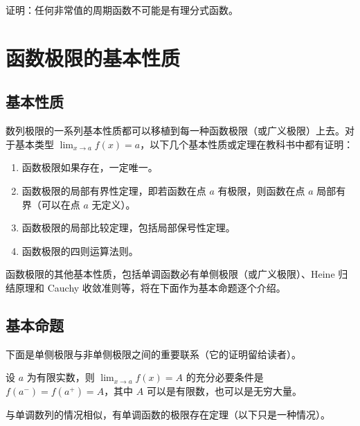 \begin{xexercise}[14]
证明：任何非常值的周期函数不可能是有理分式函数。
\end{xexercise}

\section{函数极限的基本性质}

\subsection{基本性质}

数列极限的一系列基本性质都可以移植到每一种函数极限（或广义极限）上去。对于基本类型 $\lim_{x\to a}f(x)=a$，以下几个基本性质或定理在教科书中都有证明：
\begin{enumerate}
  \item 函数极限如果存在，一定唯一。
  \item 函数极限的局部有界性定理，即若函数在点 $a$ 有极限，则函数在点 $a$ 局部有界（可以在点 $a$ 无定义）。
  \item 函数极限的局部比较定理，包括局部保号性定理。
  \item 函数极限的四则运算法则。
\end{enumerate}
函数极限的其他基本性质，包括单调函数必有单侧极限（或广义极限）、Heine 归结原理和 Cauchy 收敛准则等，将在下面作为基本命题逐个介绍。

\subsection{基本命题}

下面是单侧极限与非单侧极限之间的重要联系（它的证明留给读者）。

\begin{xproposition}[4.2.1]
设 $a$ 为有限实数，则 $\lim_{x\to a}f(x)=A$ 的充分必要条件是 $f(a^-)=f(a^+)=A$，其中 $A$ 可以是有限数，也可以是无穷大量。
\end{xproposition}

与单调数列的情况相似，有单调函数的极限存在定理（以下只是一种情况）。

